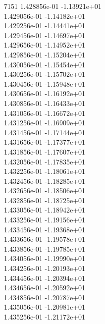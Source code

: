 7151	1.428856e-01	-1.13921e+01	\\ 	1.429056e-01	-1.14182e+01	\\ 	1.429256e-01	-1.14441e+01	\\ 	1.429456e-01	-1.14697e+01	\\ 	1.429656e-01	-1.14952e+01	\\ 	1.429856e-01	-1.15204e+01	\\ 	1.430056e-01	-1.15454e+01	\\ 	1.430256e-01	-1.15702e+01	\\ 	1.430456e-01	-1.15948e+01	\\ 	1.430656e-01	-1.16192e+01	\\ 	1.430856e-01	-1.16433e+01	\\ 	1.431056e-01	-1.16672e+01	\\ 	1.431256e-01	-1.16909e+01	\\ 	1.431456e-01	-1.17144e+01	\\ 	1.431656e-01	-1.17377e+01	\\ 	1.431856e-01	-1.17607e+01	\\ 	1.432056e-01	-1.17835e+01	\\ 	1.432256e-01	-1.18061e+01	\\ 	1.432456e-01	-1.18285e+01	\\ 	1.432656e-01	-1.18506e+01	\\ 	1.432856e-01	-1.18725e+01	\\ 	1.433056e-01	-1.18942e+01	\\ 	1.433256e-01	-1.19156e+01	\\ 	1.433456e-01	-1.19368e+01	\\ 	1.433656e-01	-1.19578e+01	\\ 	1.433856e-01	-1.19785e+01	\\ 	1.434056e-01	-1.19990e+01	\\ 	1.434256e-01	-1.20193e+01	\\ 	1.434456e-01	-1.20394e+01	\\ 	1.434656e-01	-1.20592e+01	\\ 	1.434856e-01	-1.20787e+01	\\ 	1.435056e-01	-1.20981e+01	\\ 	1.435256e-01	-1.21172e+01	\\ \hline
